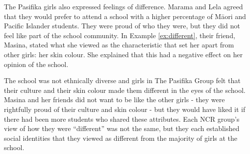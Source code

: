 The Pasifika girls also expressed feelings of difference. Marama and Lela agreed that they would prefer to attend a school with a higher percentage of M\=aori and Pacific Islander students. They were proud of who they were, but they did not feel like part of the school community. In Example \ref{ex:different}, their friend, Masina, stated what she viewed as the characteristic that set her apart from other girls: her skin colour. She explained that this had a negative effect on her opinion of the school.

\label{ex:different}

\vspace{5 mm}

\noindent The school was not ethnically diverse and girls in The Pasifika Group felt that their culture and their skin colour made them different in the eyes of the school. Masina and her friends did not want to be like the other girls - they were rightfully proud of their culture and skin colour - but they would have liked it if there had been more students who shared these attributes. Each NCR group's view of how they were ``different'' was not the same, but they each established social identities that they viewed as different from the majority of girls at the school.


